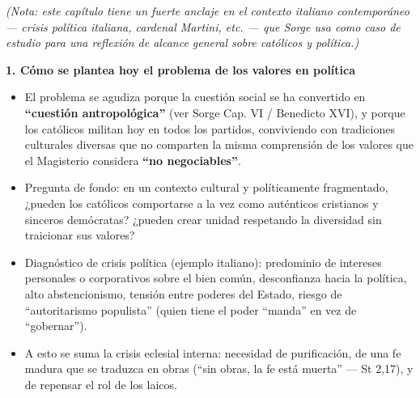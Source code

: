 \documentclass[10pt,a4paper]{article}
\begin{document}
\noindent \textit{(Nota: este capítulo tiene un fuerte anclaje en el contexto italiano contemporáneo --- crisis política italiana, cardenal Martini, etc. --- que Sorge usa como caso de estudio para una reflexión de alcance general sobre católicos y política.)}\par\smallskip

\medskip\noindent \textbf{1. Cómo se plantea hoy el problema de los valores en política}\par\nopagebreak
\begin{itemize}
\item El problema se agudiza porque la cuestión social se ha convertido en \textbf{``cuestión antropológica''} (ver Sorge Cap. VI / Benedicto XVI), y porque los católicos militan hoy en todos los partidos, conviviendo con tradiciones culturales diversas que no comparten la misma comprensión de los valores que el Magisterio considera \textbf{``no negociables''}.
\item Pregunta de fondo: en un contexto cultural y políticamente fragmentado, ¿pueden los católicos comportarse a la vez como auténticos cristianos y sinceros demócratas? ¿pueden crear unidad respetando la diversidad sin traicionar sus valores?
\item Diagnóstico de crisis política (ejemplo italiano): predominio de intereses personales o corporativos sobre el bien común, desconfianza hacia la política, alto abstencionismo, tensión entre poderes del Estado, riesgo de ``autoritarismo populista'' (quien tiene el poder ``manda'' en vez de ``gobernar'').
\item A esto se suma la crisis eclesial interna: necesidad de purificación, de una fe madura que se traduzca en obras (``sin obras, la fe está muerta'' --- St 2,17), y de repensar el rol de los laicos.
\end{itemize}
\end{document}
